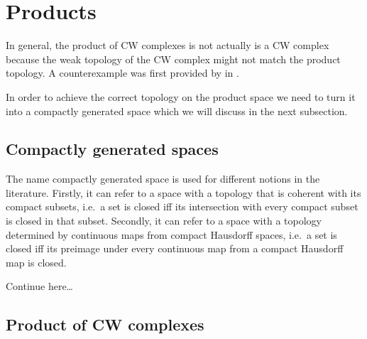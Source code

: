 \section{Products}\label{sec:products}

In general, the product of CW complexes is not actually is a CW complex because the weak topology of the CW complex might not match the product topology. 
A counterexample was first provided by \citeauthor{Dowker1952} in \cite{Dowker1952}.

In order to achieve the correct topology on the product space we need to turn it into a compactly generated space which we will discuss in the next subsection.

\subsection{Compactly generated spaces}

The name compactly generated space is used for different notions in the literature.
Firstly, it can refer to a space with a topology that is coherent with its compact subsets, i.e.\ a set is closed iff its intersection with every compact subset is closed in that subset. 
Secondly, it can refer to a space with a topology determined by continuous maps from compact Hausdorff spaces, i.e.\ a set is closed iff its preimage under every continuous map from a compact Hausdorff map is closed. 

Continue here\dots


\subsection{Product of CW complexes}

